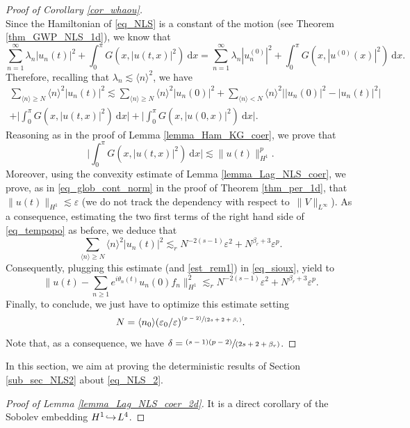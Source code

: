 \documentclass[JEP,XML,SOM,Unicode,NoEqCountersInSection,published]{cedram}
\let\epsilon\varepsilon
\newcommand\hto{\mathrel{\lhook\joinrel\to}}
\newcommand{\spfrac}[2]{\sfrac{#1}{(#2)}}
\newcommand{\pspfrac}[2]{\sfrac{(#1)}{(#2)}}
\theoremstyle{definition}
\begin{document}
\begin{proof}[Proof of Corollary \ref{cor_whaou}]
\[\]
Since the Hamiltonian of \ref{eq_NLS} is a constant of the motion (see Theorem \ref{thm_GWP_NLS_1d}), we know that
\[
\sum_{n=1}^\infty \lambda_n |u_n(t)|^2 + \int_0^\pi G(x,|u(t,x)|^2) \ \mathrm{d}x = \sum_{n=1}^\infty \lambda_n |u_n^{(0)}|^2 + \int_0^\pi G(x,|u^{(0)}(x)|^2) \ \mathrm{d}x.
\]
Therefore, recalling that $\lambda_n \lesssim \langle n \rangle^2$, we have
\begin{multline}
\label{eq_tempopo}
\sum_{\langle n \rangle \geq N} \langle n \rangle^2 |u_n(t)|^2 \lesssim \sum_{\langle n \rangle \geq N} \langle n \rangle^2 |u_n(0)|^2 + \sum_{\langle n \rangle < N } \langle n \rangle^2 \bigl||u_n(0)|^2 - |u_n(t)|^2 \bigl| \\
+ \biggl| \int_0^\pi G(x,|u(t,x)|^2) \ \mathrm{d}x \biggr| + \biggl| \int_0^\pi G(x,|u(0,x)|^2) \ \mathrm{d}x \biggr|.
\end{multline}
Reasoning as in the proof of Lemma \ref{lemma_Ham_KG_coer}, we prove that
\[
\biggl| \int_0^\pi G(x,|u(t,x)|^2) \ \mathrm{d}x \biggl| \lesssim \| u(t) \|_{H^1}^p.
\]
Moreover, using the convexity estimate of Lemma \ref{lemma_Lag_NLS_coer}, we prove, as in \eqref{eq_glob_cont_norm} in the proof of Theorem \ref{thm_per_1d}, that $\|u(t)\|_{H^1}\lesssim \varepsilon$ (we do not track the dependency with respect to~$\|V\|_{L^\infty}$). As a consequence, estimating the two first terms of the right hand side of \eqref{eq_tempopo} as before, we deduce that
\[
\sum_{\langle n \rangle \geq N} \langle n \rangle^2 |u_n(t)|^2 \lesssim_r N^{-2(s-1)} \varepsilon^2 + N^{\beta_r+3} \varepsilon^p.
\]
Consequently, plugging this estimate (and \eqref{est_rem1}) in \eqref{eq_sioux}, yield to
\[
\biggl\| u(t) - \sum_{n\geq 1} e^{i\theta_n(t)} u_n(0) f_n \biggr\|_{H^1}^2 \lesssim_r N^{-2(s-1)} \varepsilon^2 + N^{\beta_r+3} \varepsilon^p.
\]
Finally, to conclude, we just have to optimize this estimate setting
\[
N =\langle n_0\rangle (\epsilon_0/\varepsilon)^{\pspfrac{p-2}{2s+2+\beta_r}}.
\]
Note that, as a consequence, we have $\delta = \spfrac{(s-1)(p-2)}{2s+2+\beta_r}$.
\end{proof}

\label{sec_NLS_2d}

In this section, we aim at proving the deterministic results of Section \ref{sub_sec_NLS2} about \eqref{eq_NLS_2}.

\begin{proof}[Proof of Lemma \ref{lemma_Lag_NLS_coer_2d}] It is a direct corollary of the Sobolev embedding $H^1\!\hto\!L^4$.
\end{proof}
\end{document}
